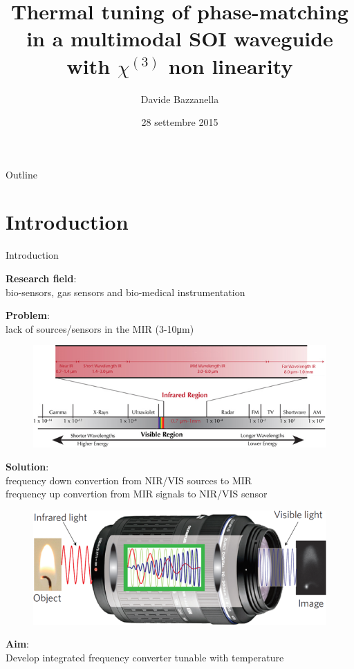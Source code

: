 \documentclass[11pt, leqno]{beamer}
\author{Davide Bazzanella}
\title{Thermal tuning of phase-matching in a multimodal SOI waveguide with $\chi^{(3)}$ non linearity}
\date{28 settembre 2015}
\begin{document}
\begin{frame}
\titlepage
\end{frame}

\begin{frame}{Outline}
\tableofcontents
\end{frame}

\section{Introduction}
\begin{frame}{Introduction}
	
	\textbf{Research field}:\\
	bio-sensors, gas sensors and bio-medical instrumentation
	
	\vspace{5pt}
	\textbf{Problem}:\\
	lack of sources/sensors in the MIR (3-10\si{\um})
	
	\begin{figure}
		\centering
		\includegraphics[width=\textwidth]{spectrum2.png}
	\end{figure}
\end{frame}
\begin{frame}
	\textbf{Solution}:\\
	frequency down convertion from NIR/VIS sources to MIR\\
	frequency up convertion from MIR signals to NIR/VIS sensor

	\begin{figure}[hb]
			\centering
			\includegraphics[width=.75\textwidth]{upconversion2_short.png}
	\end{figure}	
	\textbf{Aim}:\\
	Develop integrated frequency converter tunable with temperature
\end{frame}
\end{document}
